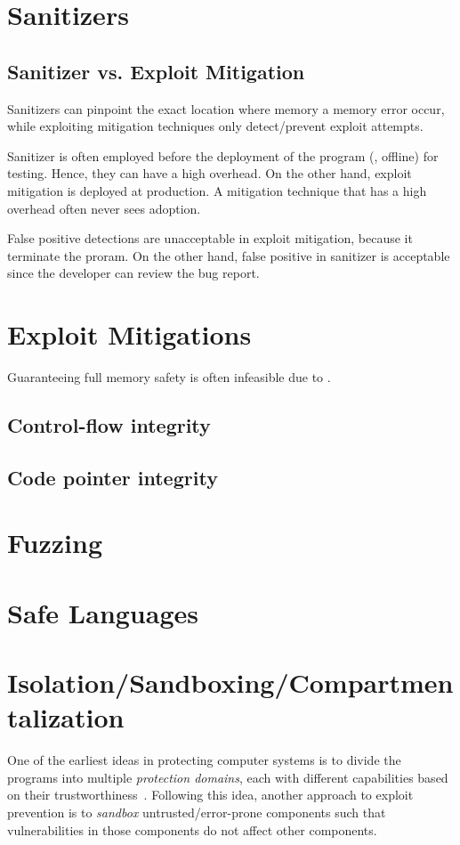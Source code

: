 \documentclass[11pt]{memoir}
\begin{document}
\section{Sanitizers}
\subsection{Sanitizer vs. Exploit Mitigation}
Sanitizers can pinpoint the exact location where memory a memory error occur, while exploiting mitigation techniques only detect/prevent exploit attempts.

Sanitizer is often employed before the deployment of the program (\ie, offline) for testing.
Hence, they can have a high overhead.
On the other hand, exploit mitigation is deployed at production.  
A mitigation technique that has a high overhead often never sees adoption.

False positive detections are unacceptable in exploit mitigation, because it terminate the proram. 
On the other hand, false positive in sanitizer is acceptable since the developer can review the bug report.




\section{Exploit Mitigations}
Guaranteeing full memory safety is often infeasible due to .
\subsection{Control-flow integrity}

\subsection{Code pointer integrity}
\cite{szekeres2013sok}


\section{Fuzzing}

\section{Safe Languages}

\section{Isolation/Sandboxing/Compartmentalization}
One of the earliest ideas in protecting computer systems is to divide the programs into multiple \emph{protection domains}, each with different capabilities based on their trustworthiness~\cite{lampson1974protection}.
Following this idea, another approach to exploit prevention is to \emph{sandbox} untrusted/error-prone components such that vulnerabilities in those components do not affect other components.
\end{document}
